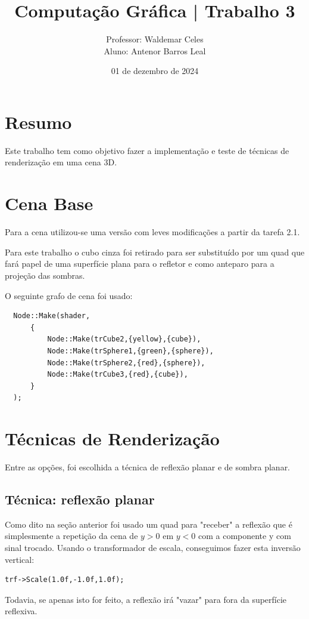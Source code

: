 \documentclass[11pt, a4paper]{article}
\title{Computação Gráfica | Trabalho 3}
\author{Professor: Waldemar Celes\\
Aluno: Antenor Barros Leal}
\date{01 de dezembro de 2024}
\begin{document}
\maketitle

\section {Resumo}
Este trabalho tem como objetivo fazer a implementação e teste de técnicas de renderização
em uma cena 3D.

\section {Cena Base}
Para a cena utilizou-se uma versão com leves modificações a partir da tarefa 2.1. 

Para este trabalho o cubo cinza foi retirado para ser substituído por um quad 
que fará papel de uma superfície plana para o refletor e como anteparo para a 
projeção das sombras.

O seguinte grafo de cena foi usado:

\begin{verbatim}
  Node::Make(shader,
      {
          Node::Make(trCube2,{yellow},{cube}),
          Node::Make(trSphere1,{green},{sphere}),
          Node::Make(trSphere2,{red},{sphere}),
          Node::Make(trCube3,{red},{cube}),
      }
  );
\end{verbatim}

\section {Técnicas de Renderização}

Entre as opções, foi escolhida a técnica de reflexão planar e de sombra planar.

\subsection {Técnica: reflexão planar}

Como dito na seção anterior foi usado um quad para "receber" a reflexão que é 
simplesmente a repetição da cena de $y > 0$ em $y < 0$ com a componente y
com sinal trocado. Usando o transformador de escala, conseguimos fazer esta 
inversão vertical:

\begin{verbatim}
trf->Scale(1.0f,-1.0f,1.0f);
\end{verbatim}

Todavia, se apenas isto for feito, a reflexão irá "vazar" para fora da superfície
reflexiva.
\end{document}
